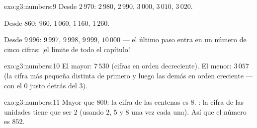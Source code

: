 \begin{solution}{exo:g3:numbers:9}
Desde $2\,970$: $2\,980$, $2\,990$, $3\,000$, $3\,010$, $3\,020$.

Desde $860$: $960$, $1\,060$, $1\,160$, $1\,260$.

Desde $9\,996$: $9\,997$, $9\,998$, $9\,999$, $10\,000$ --- el último
paso entra en un número de cinco cifras: ¡el límite de todo el capítulo!
\end{solution}

\begin{solution}{exo:g3:numbers:10}
El mayor: $7\,530$ (cifras en orden decreciente). El menor: $3\,057$
(la cifra más pequeña distinta de  primero y luego las demás en orden creciente --- con el $0$
justo detrás del $3$).
\end{solution}

\begin{solution}{exo:g3:numbers:11}
Mayor que $800$: la cifra de las centenas es $8$. : la cifra de las unidades
tiene que ser $2$ (usando $2$, $5$ y $8$ una vez cada una). Así que el número es
$852$.
\end{solution}
